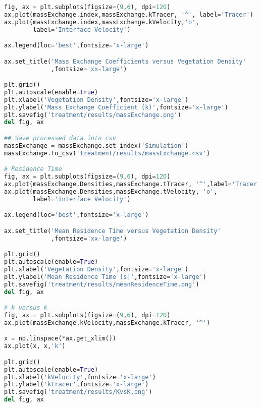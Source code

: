 \documentclass[../main.tex]{subfiles}
\begin{document}
\begin{lstlisting}[language=python]
fig, ax = plt.subplots(figsize=(9,6), dpi=120)
ax.plot(massExchange.index,massExchange.kTracer, '^', label='Tracer')
ax.plot(massExchange.index,massExchange.kVelocity,'o',
        label='Interface Velocity')

ax.legend(loc='best',fontsize='x-large')

ax.set_title('Mass Exchange Coefficients versus Vegetation Density'
             ,fontsize='xx-large')

plt.grid()
plt.autoscale(enable=True)
plt.xlabel('Vegetation Density',fontsize='x-large')
plt.ylabel('Mass Exchange Coefficient (k)',fontsize='x-large')
plt.savefig('treatment/results/massExchange.png')
del fig, ax

## Save processed data into csv
massExchange = massExchange.set_index('Simulation')
massExchange.to_csv('treatment/results/massExchange.csv')

# Residence Time
fig, ax = plt.subplots(figsize=(9,6), dpi=120)
ax.plot(massExchange.Densities,massExchange.tTracer, '^',label='Tracer')
ax.plot(massExchange.Densities,massExchange.tVelocity, 'o',
        label='Interface Velocity')

ax.legend(loc='best',fontsize='x-large')

ax.set_title('Mean Residence Time versus Vegetation Density'
             ,fontsize='xx-large')

plt.grid()
plt.autoscale(enable=True)
plt.xlabel('Vegetation Density',fontsize='x-large')
plt.ylabel('Mean Residence Time [s]',fontsize='x-large')
plt.savefig('treatment/results/meanResidenceTime.png')
del fig, ax

# k versus k
fig, ax = plt.subplots(figsize=(9,6), dpi=120)
ax.plot(massExchange.kVelocity,massExchange.kTracer, '^')

x = np.linspace(*ax.get_xlim())
ax.plot(x, x,'k')

plt.grid()
plt.autoscale(enable=True)
plt.xlabel('kVelocity',fontsize='x-large')
plt.ylabel('kTracer',fontsize='x-large')
plt.savefig('treatment/results/KvsK.png')
del fig, ax
\end{lstlisting}
\end{document}

